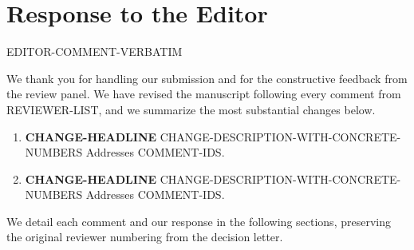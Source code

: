 %
%
\section{Response to the Editor}

\begin{editorcomment}
{{EDITOR-COMMENT-VERBATIM}}
\end{editorcomment}

\begin{editorresponse}
We thank you for handling our submission and for the constructive feedback from the review panel. We have revised the manuscript following every comment from {{REVIEWER-LIST}}, and we summarize the most substantial changes below.

\begin{enumerate}[leftmargin=*, topsep=2pt, itemsep=2pt]
    \item \textbf{{{CHANGE-HEADLINE}}} {{CHANGE-DESCRIPTION-WITH-CONCRETE-NUMBERS}} Addresses {{COMMENT-IDS}}.

    \item \textbf{{{CHANGE-HEADLINE}}} {{CHANGE-DESCRIPTION-WITH-CONCRETE-NUMBERS}} Addresses {{COMMENT-IDS}}.
\end{enumerate}

We detail each comment and our response in the following sections, preserving the original reviewer numbering from the decision letter.
\end{editorresponse}
